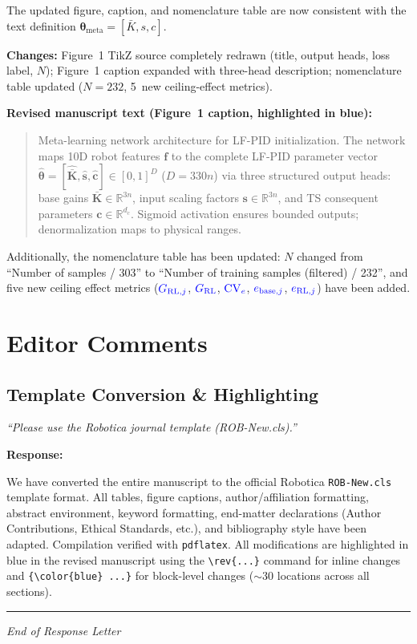 \documentclass[11pt,a4paper]{article}
\newcommand{\reviewercomment}[1]{\medskip\noindent\textit{``#1''}\medskip}
\newcommand{\response}{\noindent\textbf{Response:}\par\noindent}
\newcommand{\rev}[1]{{\color{blue}#1}}
\begin{document}
The updated figure, caption, and nomenclature table are now consistent with the text definition $\bm{\theta}_{\mathrm{meta}} = [\bar{K}, s, c]$.

\textbf{Changes:} Figure~1 TikZ source completely redrawn (title, output heads, loss label, $N$); Figure~1 caption expanded with three-head description; nomenclature table updated ($N=232$, 5~new ceiling-effect metrics).

\textbf{Revised manuscript text (Figure~1 caption, highlighted in blue):}
\begin{quote}\color{blue}\small
Meta-learning network architecture for LF-PID initialization. The network maps 10D robot features $\mathbf{f}$ to the complete LF-PID parameter vector $\hat{\bm{\theta}} = [\hat{\bar{\bm{K}}}, \hat{\bm{s}}, \hat{\bm{c}}] \in [0,1]^D$ ($D=330n$) via three structured output heads: base gains $\bar{\bm{K}} \in \mathbb{R}^{3n}$, input scaling factors $\bm{s} \in \mathbb{R}^{3n}$, and TS consequent parameters $\bm{c} \in \mathbb{R}^{d_c}$. Sigmoid activation ensures bounded outputs; denormalization maps to physical ranges.
\end{quote}

Additionally, the nomenclature table has been updated: $N$ changed from ``Number of samples / 303'' to ``\rev{Number of training samples (filtered) / 232}'', and five new ceiling effect metrics ($\rev{G_{\mathrm{RL},j}}$, $\rev{G_{\mathrm{RL}}}$, $\rev{\mathrm{CV}_e}$, $\rev{e_{\mathrm{base},j}}$, $\rev{e_{\mathrm{RL},j}}$) have been added.

\section*{Editor Comments}

\subsection*{Template Conversion \& Highlighting}

\reviewercomment{Please use the Robotica journal template (ROB-New.cls).}

\response
We have converted the entire manuscript to the official Robotica \texttt{ROB-New.cls} template format. All tables, figure captions, author/affiliation formatting, abstract environment, keyword formatting, end-matter declarations (Author Contributions, Ethical Standards, etc.), and bibliography style have been adapted. Compilation verified with \texttt{pdflatex}. All modifications are highlighted in {\color{blue}blue} in the revised manuscript using the \verb|\rev{...}| command for inline changes and \verb|{\color{blue} ...}| for block-level changes ($\sim$30 locations across all sections).

\bigskip
\hrule
\bigskip
\begin{center}
\textit{End of Response Letter}
\end{center}
\end{document}
